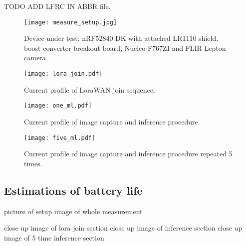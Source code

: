 
TODO ADD LFRC IN ABBR file.

\begin{figure}[ht]
    \centering
    \texttt{[image: measure\_setup.jpg]}
    \caption{ Device under test: nRF52840 DK with attached LR1110 shield, boost converter breakout board, Nucleo-F767ZI and FLIR Lepton camera.}
    \label{measure_setup}
\end{figure}
\begin{figure}[ht]
    \centering
    \texttt{[image: lora\_join.pdf]}
    \caption{ Current profile of LoraWAN join sequence.}
    \label{lora_join}
\end{figure}
\begin{figure}[ht]
    \centering
    \texttt{[image: one\_ml.pdf]}
    \caption{ Current profile of image capture and inference procedure.}
    \label{one_ml}
\end{figure}
\begin{figure}[ht]
    \centering
    \texttt{[image: five\_ml.pdf]}
    \caption{ Current profile of image capture and inference procedure repeated 5 times.}
    \label{five_ml}
\end{figure}



\subsection{ Estimations of battery life}

picture of setup
image of whole measurement 

close up image of lora join section
close up image of inference section 
close up image of 5 time inference section 


